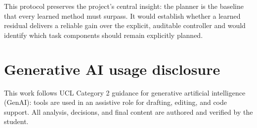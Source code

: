 \documentclass[10pt,letterpaper]{article}
\begin{document}
This protocol preserves the project's central insight: the planner is the
baseline that every learned method must surpass. It would establish whether a
learned residual delivers a reliable gain over the explicit, auditable
controller and would identify which task components should remain explicitly
planned.

\section*{Generative AI usage disclosure}
This work follows UCL Category 2 guidance for generative artificial intelligence (GenAI): tools are used in an assistive role for drafting, editing, and code support. All analysis, decisions, and final content are authored and verified by the student.
\end{document}
